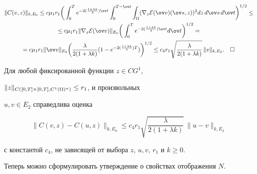 \begin{gather*}


\|C(v,z)\|_{k,E_0} \le c \mu_1 r_1 \bigg(\intl{0}{T}


e^{-2(\frac{1+\lambda k}{\lambda})\ov t}\intl{0}{T-\ov


t}\intl{\Om}{}(\nabla_z {\E(\ov


v)}(\ov s,z))^2 dz\, d\ov s \,d\ov t\bigg)^{1/2} \le \\


%


\le c \mu_1 r_1 \| \nabla_x {\E(\ov v)}\|_{E_0}


\bigg(\intl{0}{T} e^{-2(\frac{1+\lambda k}{\lambda})\ov t}d\ov


t\bigg)^{1/2}=\\


%


=c\mu_1 r_1 \|\ov v\|_{E_2} \bigg(\frac{\lambda}{2(1+\lambda


k)}(1-e^{-2(\frac{1+\lambda


k}{\lambda})T})\bigg)^{1/2} \le c_4 r_1


\sqrt{\frac{\lambda}{2(1+\lambda k)}}\, \|v\|_{k,E_2}.\quad\square


\end{gather*}








\begin{cors}\label{s32}


Для любой фиксированной функции $z \in CG^1$,


$\|z\|_{C([0,T]\times [0,T], C^1(\Omega)^n)}\le r_1$, и произвольных


$u,v\in E_2$ справедлива оценка


\begin{equation}\label{e313}


\|C(v, z)-C(u, z)\|_{k,E_0} \le c_4 r_1 \sqrt{\frac{\lambda}{2(1+


\lambda k)}}\, \|u-v\|_{k,E_2}


\end{equation}


с константой $c_4$, не зависящей от выбора $z$, $u, v$, $r_1$ и $k\ge 0$.


\end{cors}





Теперь можно сформулировать утверждение о свойствах отображения $N$.





